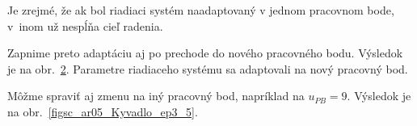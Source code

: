 \documentclass[a4paper, 10pt, ]{article}
\begin{document}
\begin{figure}[!b]
	\centering

    \vspace{-3mm}


    \vspace{-2mm}

	\caption{}
	\label{figsc_ar05_Kyvadlo_ep3_3}

    \vspace{-2mm}

\end{figure}



Je zrejmé, že ak bol riadiaci systém naadaptovaný v jednom pracovnom bode, v~inom už nespĺňa cieľ radenia.



Zapnime preto adaptáciu aj po prechode do nového pracovného bodu. Výsledok je na obr.~\ref{figsc_ar05_Kyvadlo_ep3_4}. Parametre riadiaceho systému sa adaptovali na nový pracovný bod.





\begin{figure}[!t]
	\centering

    \vspace{-3mm}


    \vspace{-2mm}

	\caption{}
	\label{figsc_ar05_Kyvadlo_ep3_4}

    \vspace{-2mm}

\end{figure}





Môžme spraviť aj zmenu na iný pracovný bod, napríklad na  $u_{PB} = 9$. Výsledok je na obr.~\ref{figsc_ar05_Kyvadlo_ep3_5}.



\vfill

\phantom{}
\end{document}
